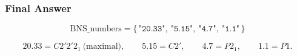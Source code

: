 \subsubsection*{Final Answer}

\[
\boxed{
\mathrm{BNS\_numbers}=\{\,\texttt{"20.33"},\ \texttt{"5.15"},\ \texttt{"4.7"},\ \texttt{"1.1"}\,\}
}
\]

\[
20.33=C2'2'2_1\ \text{(maximal)},\qquad 5.15=C2',\qquad 4.7=P2_1,\qquad 1.1=P1.
\]
